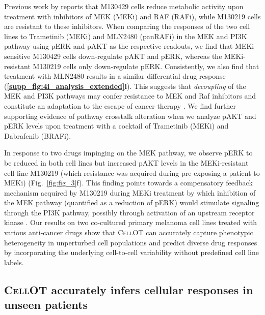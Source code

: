 Previous work by \citet{smith2016inhibiting} reports that M130429 cells reduce metabolic activity %
upon treatment with inhibitors of MEK (MEKi) and RAF (RAFi), while M130219 cells are resistant to these inhibitors. When comparing the responses of the two cell lines to Trametinib (MEKi) and MLN2480 (panRAFi) in the MEK and PI3K pathway using pERK and pAKT as the respective readouts, we find that MEKi-sensitive M130429 cells down-regulate pAKT and pERK, whereas the MEKi-resistant M130219 cells only down-regulate pERK. Consistently, we also find that treatment with MLN2480 results in a similar differential drug response (\textbf{\ref{supp_fig:4i_analysis_extended}i}). This suggests that \textit{decoupling} of the MEK and PI3K pathways may confer resistance to MEK and Raf inhibitors and constitute an adaptation to the escape of cancer therapy \cite{kun2021mek}. We find further supporting evidence of pathway crosstalk alteration when we analyze pAKT and pERK levels upon treatment with a cocktail of Trametinib (MEKi) and Dabrafenib (BRAFi). 

In response to two drugs impinging on the MEK pathway, we observe pERK to be reduced in both cell lines but increased pAKT levels in the MEKi-resistant cell line M130219 (which resistance was acquired during pre-exposing a patient to MEKi) ({Fig.~\ref{fig:fig_3}f}). This finding points towards a compensatory feedback mechanism acquired by M130219 during MEKi treatment by which inhibition of the MEK pathway (quantified as a reduction of pERK) would stimulate signaling through the PI3K pathway, possibly through activation of an upstream receptor kinase \cite{caunt2015mek1}. 
Our results on two co-cultured primary melanoma cell lines treated with various anti-cancer drugs show that \textsc{CellOT} can accurately capture phenotypic heterogeneity in unperturbed cell populations and predict diverse drug responses by incorporating the underlying cell-to-cell variability without predefined cell line labels. 


\subsection{\textsc{CellOT} accurately infers cellular responses in unseen patients}

